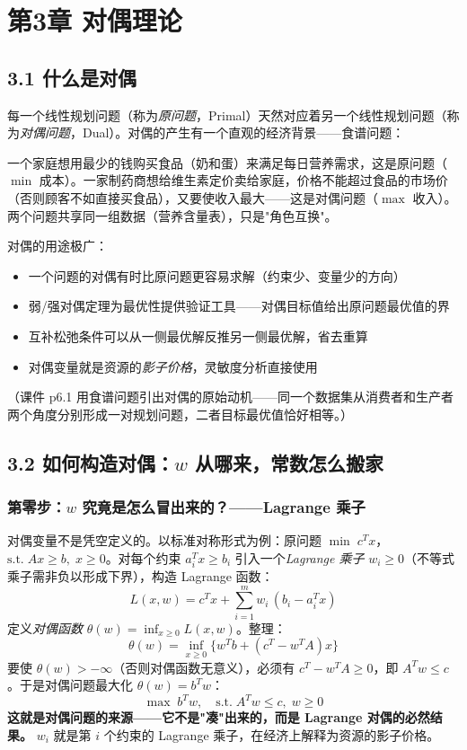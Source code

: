 \section{第3章 \quad 对偶理论}

\subsection{3.1 什么是对偶}

每一个线性规划问题（称为\emph{原问题}，Primal）天然对应着另一个线性规划问题（称为\emph{对偶问题}，Dual）。对偶的产生有一个直观的经济背景——食谱问题：

一个家庭想用最少的钱购买食品（奶和蛋）来满足每日营养需求，这是原问题（$\min$ 成本）。一家制药商想给维生素定价卖给家庭，价格不能超过食品的市场价（否则顾客不如直接买食品），又要使收入最大——这是对偶问题（$\max$ 收入）。两个问题共享同一组数据（营养含量表），只是"角色互换"。

对偶的用途极广：
\begin{itemize}
  \item 一个问题的对偶有时比原问题更容易求解（约束少、变量少的方向）
  \item 弱/强对偶定理为最优性提供验证工具——对偶目标值给出原问题最优值的界
  \item 互补松弛条件可以从一侧最优解反推另一侧最优解，省去重算
  \item 对偶变量就是资源的\emph{影子价格}，灵敏度分析直接使用
\end{itemize}

（课件 p6.1 用食谱问题引出对偶的原始动机——同一个数据集从消费者和生产者两个角度分别形成一对规划问题，二者目标最优值恰好相等。）

\subsection{3.2 如何构造对偶：$w$ 从哪来，常数怎么搬家}

\subsubsection{第零步：$w$ 究竟是怎么冒出来的？——Lagrange 乘子}

对偶变量不是凭空定义的。以标准对称形式为例：原问题 $\min\; c^T x$，$\text{s.t.}\; Ax \ge b,\; x \ge 0$。对每个约束 $a_i^T x \ge b_i$ 引入一个\emph{Lagrange 乘子} $w_i \ge 0$（不等式乘子需非负以形成下界），构造 Lagrange 函数：
\[
L(x, w) = c^T x + \sum_{i=1}^{m} w_i\,(b_i - a_i^T x)
\]
定义\emph{对偶函数} $\theta(w) = \inf_{x \ge 0} L(x, w)$。整理：
\[
\theta(w) = \inf_{x \ge 0} \bigl\{ w^T b + (c^T - w^T A)x \bigr\}
\]
要使 $\theta(w) > -\infty$（否则对偶函数无意义），必须有 $c^T - w^T A \ge 0$，即 $A^T w \le c$。于是对偶问题最大化 $\theta(w) = b^T w$：
\[
\max\; b^T w,\quad \text{s.t.}\; A^T w \le c,\; w \ge 0
\]
\textbf{这就是对偶问题的来源——它不是"凑"出来的，而是 Lagrange 对偶的必然结果。} $w_i$ 就是第 $i$ 个约束的 Lagrange 乘子，在经济上解释为资源的影子价格。


